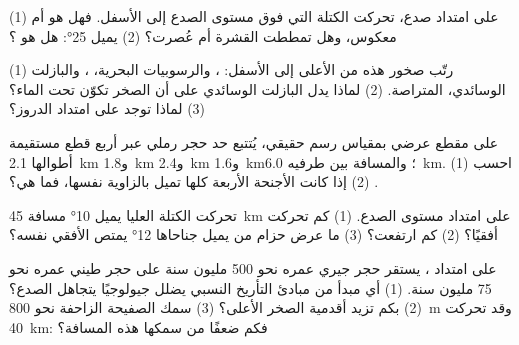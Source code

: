 \begin{exercise}[$\star$]\label{exo:g12:mountain-building:4}
(1) على امتداد صدع، تحركت الكتلة التي فوق مستوى الصدع إلى الأسفل. فهل هو
 أم معكوس، وهل تمططت القشرة أم عُصرت؟
(2)  يميل \ang{25}: هل هو ؟
\end{exercise}

\begin{exercise}[$\star$]\label{exo:g12:mountain-building:5}
(1) رتّب صخور  هذه من الأعلى إلى الأسفل: ،
والرسوبيات البحرية، ، والبازلت الوسائدي،  المتراصة. (2) لماذا يدل
البازلت الوسائدي على أن الصخر تكوّن تحت الماء؟ (3) لماذا توجد
 على امتداد الدروز؟
\end{exercise}

\begin{exercise}[$\star\star$]\label{exo:g12:mountain-building:6}
على مقطع عرضي بمقياس رسم حقيقي، يُتتبع حد حجر رملي عبر أربع
قطع مستقيمة أطوالها \qty{2.1}{km} و\qty{1.8}{km} و\qty{2.4}{km}
و\qty{1.6}{km}؛ والمسافة بين طرفيه \qty{6.0}{km}. (1) احسب
. (2) إذا كانت الأجنحة الأربعة كلها تميل بالزاوية نفسها، فما هي؟
\end{exercise}

\begin{exercise}[$\star\star$]\label{exo:g12:mountain-building:7}
تحركت الكتلة العليا  يميل \ang{10} مسافة \qty{45}{km} على امتداد
مستوى الصدع. (1) كم تحركت أفقيًا؟ (2) كم
ارتفعت؟ (3) ما عرض حزام من  يميل جناحاها \ang{12} يمتص
 الأفقي نفسه؟
\end{exercise}

\begin{exercise}[$\star\star$]\label{exo:g12:mountain-building:8}
على امتداد ، يستقر حجر جيري عمره نحو 500 مليون سنة على
حجر طيني عمره نحو 75 مليون سنة. (1) أي مبدأ من مبادئ التأريخ النسبي
يضلل جيولوجيًا يتجاهل الصدع؟ (2) بكم تزيد أقدمية
الصخر الأعلى؟ (3) سمك الصفيحة الزاحفة نحو \qty{800}{m} وقد تحركت
\qty{40}{km}: فكم ضعفًا من سمكها هذه المسافة؟
\end{exercise}

